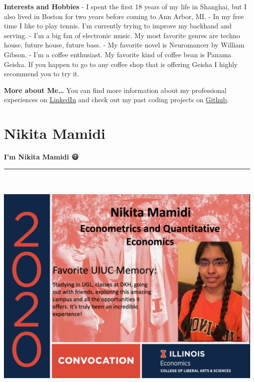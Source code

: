 \documentclass[
]{book}
\begin{document}
\textbf{Interests and Hobbies}
- I spent the first 18 years of my life in Shanghai, but I also lived in Boston for two years before coming to Ann Arbor, MI.
- In my free time I like to play tennis. I'm currently trying to improve my backhand and serving.
- I'm a big fan of electronic music. My most favorite genres are techno house, future house, future bass.
- My favorite novel is Neuromancer by William Gibson.
- I'm a coffee enthusiast. My favorite kind of coffee bean is Panama Geisha. If you happen to go to any coffee shop that is offering Geisha I highly recommend you to try it.

\textbf{More about Me\ldots{}}
You can find more information about my professional experiences on \href{https://www.linkedin.com/in/ycg2022/}{LinkedIn} and check out my past coding projects on \href{https://github.com/Yuchen-G}{Github}.

\hypertarget{nikita-mamidi}{%
\section{Nikita Mamidi}\label{nikita-mamidi}}

\textbf{I'm Nikita Mamidi 😃}

\begin{center}\rule{0.5\linewidth}{0.5pt}\end{center}

\includegraphics[width=9.375in,height=4.6875in]{nikita1.png}
\end{document}
